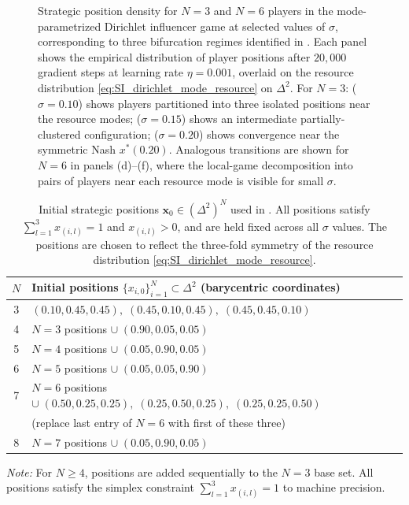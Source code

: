 \documentclass{article}
\begin{document}
\begin{figure}[ht!]
            \caption{Strategic position density for $N = 3$ and $N = 6$ players in the mode-parametrized Dirichlet influencer game at selected values of $\sigma$, corresponding to three bifurcation regimes identified in .
                Each panel shows the empirical distribution of player positions after $20{,}000$ gradient steps at learning rate $\eta = 0.001$, overlaid on the resource distribution \cref{eq:SI_dirichlet_mode_resource} on $\Delta^2$. For $N = 3$:  ($\sigma=0.10$) shows players partitioned into three isolated positions near the resource modes;  ($\sigma=0.15$) shows an intermediate partially-clustered configuration;  ($\sigma=0.20$) shows convergence near the symmetric Nash $x^*(0.20)$. Analogous transitions are shown for $N=6$ in panels (d)--(f), where the local-game decomposition into pairs of players near each resource mode is visible for small $\sigma$.}
            \label{fig:dirichlet_simplex}
        \end{figure}

        \begin{table}[ht!]
            \centering
            \caption{Initial strategic positions $\mathbf{x}_0 \in (\Delta^2)^N$ used in .
                All positions satisfy $\sum_{l=1}^3 x_{(i,l)} = 1$ and $x_{(i,l)} > 0$, and are held fixed across all $\sigma$ values.
                The positions are chosen to reflect the three-fold symmetry of the resource distribution \cref{eq:SI_dirichlet_mode_resource}.}
            \label{tab:SI_dirichlet_mode_initial}
            \begin{tabular}{cl}
                \toprule
                $N$ & Initial positions $\{x_{i,0}\}_{i=1}^N \subset \Delta^2$ (barycentric coordinates) \\
                \midrule
                3 & $(0.10, 0.45, 0.45),\;(0.45, 0.10, 0.45),\;(0.45, 0.45, 0.10)$ \\
                4 & $N=3$ positions $\cup\;(0.90, 0.05, 0.05)$ \\
                5 & $N=4$ positions $\cup\;(0.05, 0.90, 0.05)$ \\
                6 & $N=5$ positions $\cup\;(0.05, 0.05, 0.90)$ \\
                7 & $N=6$ positions $\cup\;(0.50, 0.25, 0.25),\;(0.25, 0.50, 0.25),\;(0.25, 0.25, 0.50)$ \\
                & \quad (replace last entry of $N=6$ with first of these three) \\
                8 & $N=7$ positions $\cup\;(0.05, 0.90, 0.05)$ \\
                \bottomrule
            \end{tabular}
            \medskip

            \noindent\textit{Note:} For $N \geq 4$, positions are added sequentially to the $N=3$ base set.
            All positions satisfy the simplex constraint $\sum_{l=1}^3 x_{(i,l)} = 1$ to machine precision.
        \end{table}
\clearpage
\end{document}
